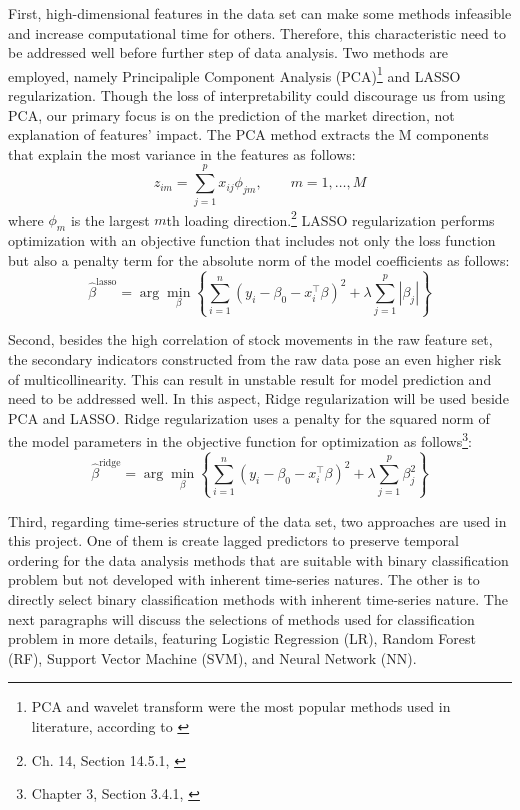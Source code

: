 \documentclass[11pt]{article}
\begin{document}
First, high-dimensional features in the data set can make some methods infeasible and increase computational time for others. Therefore, this characteristic need to be addressed well before further step of data analysis. Two methods are employed, namely Principaliple Component Analysis (PCA)\footnote{PCA and wavelet transform were the most popular methods used in literature, according to \citeauthor{KUMBURE_2022}} and LASSO regularization. Though the loss of interpretability could discourage us from using PCA, our primary focus is on the prediction of the market direction, not explanation of features' impact. 
The PCA method extracts the M components that explain the most variance in the features as follows:
\[
z_{im} = \sum_{j=1}^p x_{ij} \phi_{jm}, \qquad m=1,\dots,M
\]
where $\phi_m$ is the largest $m$th loading direction.\footnote{Ch. 14, Section 14.5.1, \cite{ESL}}
LASSO regularization performs optimization with an objective function that includes not only the loss function but also a penalty term for the absolute norm of the model coefficients as follows: 
    \[
    \hat{\beta}^{\mathrm{lasso}}
    = \arg\min_{\beta}\left\{
    \sum_{i=1}^n (y_i-\beta_0-x_i^\top \beta)^2
    + \lambda \sum_{j=1}^p |\beta_j|
    \right\}
    \]

Second, besides the high correlation of stock movements in the raw feature set, the secondary indicators constructed from the raw data pose an even higher risk of multicollinearity. This can result in unstable result for model prediction and need to be addressed well. In this aspect, Ridge regularization will be used beside PCA and LASSO. Ridge regularization uses a penalty for the squared norm of the model parameters in the objective function for optimization as follows\footnote{Chapter 3, Section 3.4.1, \cite{ESL}}: 
    \[
    \hat{\beta}^{\mathrm{ridge}}
    = \arg\min_{\beta}\left\{
    \sum_{i=1}^n (y_i-\beta_0-x_i^\top \beta)^2
    + \lambda \sum_{j=1}^p \beta_j^2
    \right\}
    \]
    
Third, regarding time-series structure of the data set, two approaches are used in this project. One of them is create lagged predictors to preserve temporal ordering for the data analysis methods that are suitable with binary classification problem but not developed with inherent time-series natures. The other is to directly select binary classification methods with inherent time-series nature. The next paragraphs will discuss the selections of methods used for classification problem in more details, featuring Logistic Regression (LR), Random Forest (RF), Support Vector Machine (SVM), and Neural Network (NN).
\end{document}
